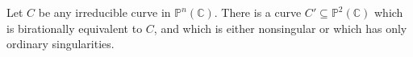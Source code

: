 Let $C$ be any irreducible curve in $\mathbb{P}^n(\mathbb{C})$. There is a curve $C' \subseteq \mathbb{P}^2(\mathbb{C})$ which is birationally equivalent to $C$, and which is either nonsingular or which has only ordinary singularities.
